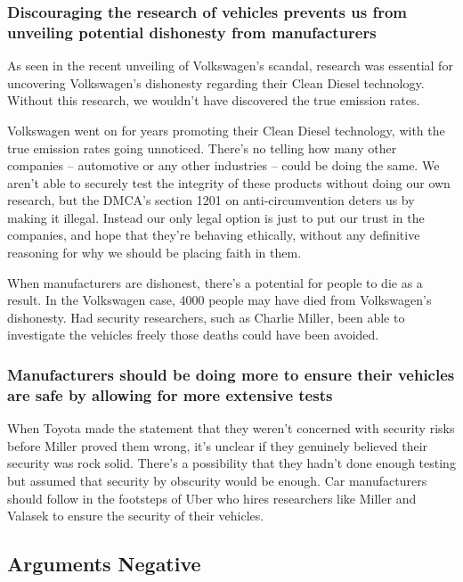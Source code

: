 \documentclass[12pt]{article}
\begin{document}
\begin{multicols}{2}
\subsubsection{Discouraging the research of vehicles prevents us from unveiling potential dishonesty from manufacturers}

As seen in the recent unveiling of Volkswagen's scandal, research was essential for uncovering Volkswagen's dishonesty regarding their Clean Diesel technology. \cite{vwScandal} Without this research, we wouldn't have discovered the true emission rates.

Volkswagen went on for years promoting their Clean Diesel technology, with the true emission rates going unnoticed. There's no telling how many other companies -- automotive or any other industries -- could be doing the same. We aren't able to securely test the integrity of these products without doing our own research, but the DMCA's section 1201 on anti-circumvention deters us by making it illegal. Instead our only legal option is just to put our trust in the companies, and hope  that they're behaving ethically, without any definitive reasoning for why we should be placing faith in them. \cite{brokeDMCA} 

When manufacturers are dishonest, there's a potential for people to die as a result. In the Volkswagen case, 4000 people may have died from Volkswagen's dishonesty.\cite{vwkills} Had security researchers, such as Charlie Miller, been able to investigate the vehicles freely those deaths could have been avoided.

\subsubsection{Manufacturers should be doing more to ensure their vehicles are safe by allowing for more extensive tests}

When Toyota made the statement that they weren't concerned with security risks \cite{originalHack} before Miller proved them wrong, it's unclear if they genuinely believed their security was rock solid. There's a possibility that they hadn't done enough testing but assumed that security by obscurity would be enough\cite{brokeDMCA}. Car manufacturers should follow in the footsteps of Uber who hires researchers like Miller and Valasek to ensure the security of their vehicles\cite{uber}.


\subsection{Arguments Negative}


\end{multicols}
\end{document}
